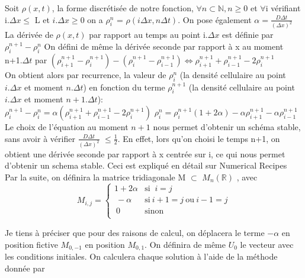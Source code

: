 \documentclass[12pt,a4paper]{article}
\begin{document}
Soit $\rho(x,t)$, la forme discrétisée de notre fonction,
$\forall n\subset \mathbb{N}, n\geq 0$ et $\forall$i vérifiant  
i.$\Delta x \leq$ L et $i.\Delta
x \geq 0$ on a $\rho^n_i$ = $\rho(i\Delta x , n\Delta t)$. On
pose également $\alpha = \frac{D\Delta t}{(\Delta x)^2}$ 
\\
La dérivée de $\rho(x,t)$ par rapport au temps au point i.$\Delta x$ 
est définie par $\rho^{n+1}_i - \rho^n_i $ 
On défini de même la dérivée seconde par rapport à x au moment 
n+1.$\Delta t$ par $ ( \rho^{n+1}_{i+1} -\rho^{n+1}_{i} )  - ( 
\rho^{n+1}_{i} - \rho^{n+1}_{i-1} ) \Leftrightarrow \rho^{n+1}_{i+1} 
+\rho^{n+1}_{i-1} -2\rho^{n+1}_{i} $
\\
On obtient alors par recurrence, la valeur de $\rho^n_i$ (la densité 
cellulaire au point $i.\Delta x$ et moment $n.\Delta t$) en fonction 
du terme $\rho^{n+1}_i$ (la densité cellulaire au point $i.\Delta x$ 
et moment $n+1.\Delta t$): 
\\
$ \rho^{n+1}_i - \rho^n_i = 
\alpha (\rho^{n+1}_{i+1} +\rho^{n+1}_{i-1} -2\rho^{n+1}_{i}) $ \Leftrightarrow 
$\rho^n_i = \rho^{n+1}_i(1+2\alpha) - \alpha 
\rho^{n+1}_{i+1}-\alpha\rho^{n+1}_{i-1}$
\\
Le choix de l'équation au moment $n+1$ nous 
permet d'obtenir un schéma stable, sans avoir à vérifier 
$\frac{D\Delta t}{(\Delta x)^2}$ $\leq \frac{1}{2}$.
En effet, lors qu'on choisi le temps n+1, on obtient une dérivée 
seconde par rapport à x centrée sur i, ce qui nous permet d'obtenir un
schema stable. Ceci est expliqué en détail sur Numerical Recipes \cite{m}
\\
Par la suite, on définira la matrice tridiagonale M $\subset$ ${M_n (\mathbb{R})}$ , avec 
$$M_{i,j} = \left\{
    \begin{array}{ll}
        1+2\alpha & \mbox{si } \ i=j \\
        \ -\alpha & \mbox{si}  \ {i+1=j} \ \mbox{ou} \ {i-1=j}  \\
         \ 0 & \mbox{sinon} \\
    \end{array}
\right.
$$

Je tiens à préciser que pour des raisons de calcul, on déplacera le terme $- \alpha$ en position fictive $M_{0, -1}$ en position $M_{0,1}$. On définira de même $U_0$ le vecteur avec les conditions initiales. On calculera chaque solution à l'aide de la méthode donnée par \cite{m}
\\
\end{document}
